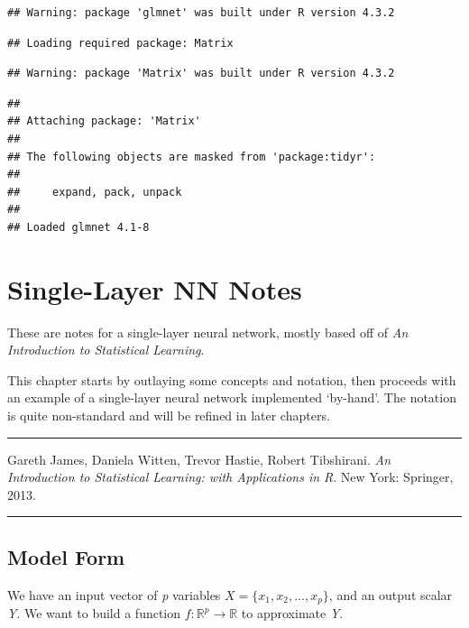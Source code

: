 \documentclass[
]{book}
\begin{document}
\begin{verbatim}
## Warning: package 'glmnet' was built under R version 4.3.2
\end{verbatim}

\begin{verbatim}
## Loading required package: Matrix
\end{verbatim}

\begin{verbatim}
## Warning: package 'Matrix' was built under R version 4.3.2
\end{verbatim}

\begin{verbatim}
## 
## Attaching package: 'Matrix'
## 
## The following objects are masked from 'package:tidyr':
## 
##     expand, pack, unpack
## 
## Loaded glmnet 4.1-8
\end{verbatim}

\hypertarget{single-layer-nn-notes}{%
\chapter{Single-Layer NN Notes}\label{single-layer-nn-notes}}

These are notes for a single-layer neural network, mostly based off of \emph{An Introduction to Statistical Learning}.

This chapter starts by outlaying some concepts and notation, then proceeds with an example of a single-layer neural network implemented `by-hand'. The notation is quite non-standard and will be refined in later chapters.

\begin{center}\rule{0.5\linewidth}{0.5pt}\end{center}

Gareth James, Daniela Witten, Trevor Hastie, Robert Tibshirani. \emph{An Introduction to Statistical Learning: with Applications in R}. New York: Springer, 2013.

\begin{center}\rule{0.5\linewidth}{0.5pt}\end{center}

\hypertarget{model-form}{%
\section{Model Form}\label{model-form}}

We have an input vector of \emph{p} variables \(X = \{x_1, x_2, \dots, x_p\}\), and an output scalar \emph{Y}. We want to build a function \(f: \mathbb{R}^p \to \mathbb{R}\) to approximate \emph{Y}.
\end{document}
